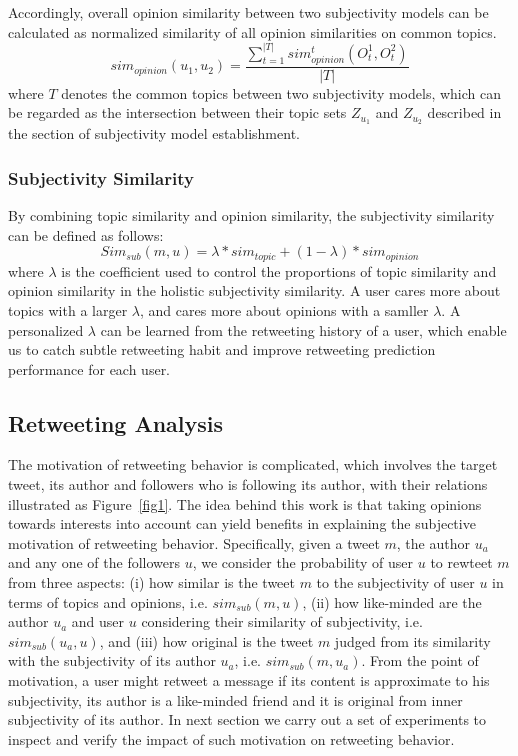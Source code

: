 \documentclass{acm_proc_article-sp}
\begin{document}
Accordingly, overall opinion similarity between two subjectivity models can be calculated as normalized similarity of all opinion similarities on common topics. 
\begin{equation}
sim_{opinion}(u_{1},u_{2})=\dfrac{\sum_{t=1}^{|T|}sim_{opinion}^{t}(O_{t}^{1},O_{t}^{2})}{|T|}
\end{equation}
where $ T $ denotes the common topics between two subjectivity models, which can be regarded as the intersection between their topic sets $ Z_{u_{1}} $ and $ Z_{u_{2}} $ described in the section of subjectivity model establishment. 

\subsubsection{Subjectivity Similarity}

By combining topic similarity and opinion similarity, the subjectivity similarity can be defined as follows:
\begin{equation}
\label{subsim}
Sim_{sub} \left( m,u \right) = \lambda * sim_{topic}+\left( 1-\lambda \right)*sim_{opinion}
\end{equation}
where $ \lambda $ is the coefficient used to control the proportions of topic similarity and opinion similarity in the holistic subjectivity similarity. 
A user cares more about topics with a larger $ \lambda $, and cares more about opinions with a samller $ \lambda $. 
A personalized $ \lambda $ can be learned from the retweeting history of a user, which enable us to catch subtle retweeting habit and improve retweeting prediction performance for each user. 

\subsection{Retweeting Analysis}
\label{analysis}

The motivation of retweeting behavior is complicated, which involves the target tweet, its author and followers who is following its author, with their relations illustrated as Figure~\ref{fig1}. 
The idea behind this work is that taking opinions towards interests into account can yield benefits in explaining the subjective motivation of retweeting behavior. 
Specifically, given a tweet $ m $, the author $ u_{a} $ and any one of the followers $ u $, we consider the probability of user $ u $ to rewteet $ m $ from three aspects: 
(i) how similar is the tweet $ m $ to the subjectivity of user $ u $ in terms of topics and opinions, i.e. $ sim_{sub} \left( m,u \right) $, (ii) how like-minded are the author $ u_{a} $ and user $ u $ considering their similarity of subjectivity, i.e. $ sim_{sub}\left( u_{a},u \right) $, and (iii) how original is the tweet $ m $ judged from its similarity with the subjectivity of its author $ u_{a} $, i.e. $ sim_{sub}\left( m,u_{a} \right)  $. 
From the point of motivation, a user might retweet a message if its content is approximate to his subjectivity, its author is a like-minded friend and it is original from inner subjectivity of its author. 
In next section we carry out a set of experiments to inspect and verify the impact of such motivation on retweeting behavior. 
\end{document}

